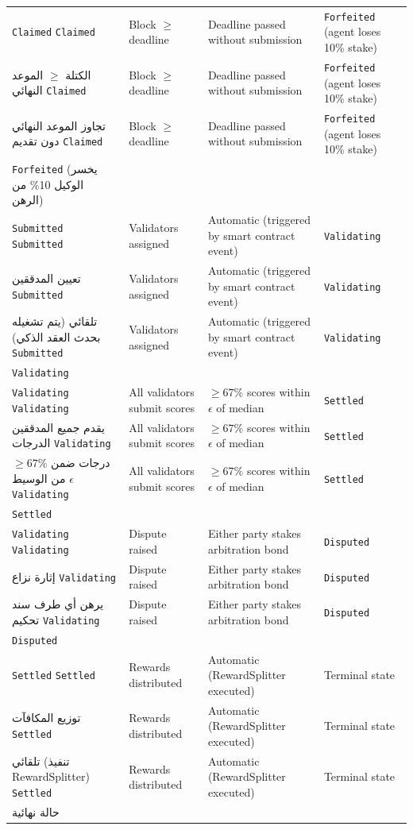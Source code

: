\documentclass[11pt]{article}
\begin{document}
\begin{longtable}{@{}p{}p{}p{}p{}@{}}
\texttt{Claimed} \texttt{Claimed} & Block $\geq$ deadline & Deadline passed without submission & \texttt{Forfeited} (agent loses 10\% stake) \\ الكتلة $\geq$ الموعد النهائي \texttt{Claimed} & Block $\geq$ deadline & Deadline passed without submission & \texttt{Forfeited} (agent loses 10\% stake) \\ تجاوز الموعد النهائي دون تقديم \texttt{Claimed} & Block $\geq$ deadline & Deadline passed without submission & \texttt{Forfeited} (agent loses 10\% stake) \\ \texttt{Forfeited} (يخسر الوكيل 10\% من الرهن) \\
\texttt{Submitted} \texttt{Submitted} & Validators assigned & Automatic (triggered by smart contract event) & \texttt{Validating} \\ تعيين المدققين \texttt{Submitted} & Validators assigned & Automatic (triggered by smart contract event) & \texttt{Validating} \\ تلقائي (يتم تشغيله بحدث العقد الذكي) \texttt{Submitted} & Validators assigned & Automatic (triggered by smart contract event) & \texttt{Validating} \\ \texttt{Validating} \\
\texttt{Validating} \texttt{Validating} & All validators submit scores & $\geq 67\%$ scores within $\epsilon$ of median & \texttt{Settled} \\ يقدم جميع المدققين الدرجات \texttt{Validating} & All validators submit scores & $\geq 67\%$ scores within $\epsilon$ of median & \texttt{Settled} \\ $\geq 67\%$ درجات ضمن $\epsilon$ من الوسيط \texttt{Validating} & All validators submit scores & $\geq 67\%$ scores within $\epsilon$ of median & \texttt{Settled} \\ \texttt{Settled} \\
\texttt{Validating} \texttt{Validating} & Dispute raised & Either party stakes arbitration bond & \texttt{Disputed} \\ إثارة نزاع \texttt{Validating} & Dispute raised & Either party stakes arbitration bond & \texttt{Disputed} \\ يرهن أي طرف سند تحكيم \texttt{Validating} & Dispute raised & Either party stakes arbitration bond & \texttt{Disputed} \\ \texttt{Disputed} \\
\texttt{Settled} \texttt{Settled} & Rewards distributed & Automatic (RewardSplitter executed) & Terminal state \\ توزيع المكافآت \texttt{Settled} & Rewards distributed & Automatic (RewardSplitter executed) & Terminal state \\ تلقائي (تنفيذ RewardSplitter) \texttt{Settled} & Rewards distributed & Automatic (RewardSplitter executed) & Terminal state \\ حالة نهائية \\

\end{longtable}
\end{document}

